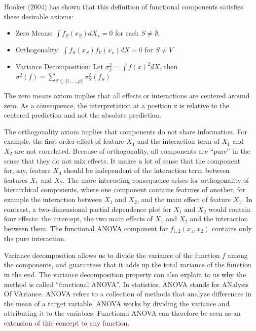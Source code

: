 \documentclass[
  12pt,
]{krantz}
\providecommand{\tightlist}{%
  \setlength{\itemsep}{0pt}\setlength{\parskip}{0pt}}
\begin{document}
Hooker (2004) has shown that this definition of functional components satisfies these desirable axioms:

\begin{itemize}
\tightlist
\item
  Zero Means: \(\int{}f_S(x_S)dX_s=0\) for each \(S\neq\emptyset\).
\item
  Orthogonality: \(\int{}f_S(x_S)f_V(x_v)dX=0\) for \(S\neq{}V\)
\item
  Variance Decomposition: Let \(\sigma^2_{f}=\int{}f(x)^2dX\), then \(\sigma^2(f) = \sum_{S \subseteq \{1,\ldots,p\}} \sigma^2_S(f_S)\)
\end{itemize}

The zero means axiom implies that all effects or interactions are centered around zero.
As a consequence, the interpretation at a position x is relative to the centered prediction and not the absolute prediction.

The orthogonality axiom implies that components do not share information.
For example, the first-order effect of feature \(X_1\) and the interaction term of \(X_{1}\) and \(X_2\) are not correlated.
Because of orthogonality, all components are ``pure'' in the sense that they do not mix effects.
It makes a lot of sense that the component for, say, feature \(X_4\) should be independent of the interaction term between features \(X_1\) and \(X_2\).
The more interesting consequence arises for orthogonality of hierarchical components, where one component contains features of another, for example the interaction between \(X_1\) and \(X_2\), and the main effect of feature \(X_1\).
In contrast, a two-dimensional partial dependence plot for \(X_1\) and \(X_2\) would contain four effects: the intercept, the two main effects of \(X_1\) and \(X_2\) and the interaction between them.
The functional ANOVA component for \(f_{1,2}(x_1,x_2)\) contains only the pure interaction.

Variance decomposition allows us to divide the variance of the function \(f\) among the components, and guarantees that it adds up the total variance of the function in the end.
The variance decomposition property can also explain to us why the method is called ``functional ANOVA''.
In statistics, ANOVA stands for ANalysis Of VAriance.
ANOVA refers to a collection of methods that analyze differences in the mean of a target variable.
ANOVA works by dividing the variance and attributing it to the variables.
Functional ANOVA can therefore be seen as an extension of this concept to any function.
\end{document}
